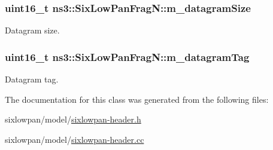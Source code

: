 \subsubsection[{\texorpdfstring{m\+\_\+datagram\+Size}{m_datagramSize}}]{\setlength{\rightskip}{0pt plus 5cm}uint16\+\_\+t ns3\+::\+Six\+Low\+Pan\+Frag\+N\+::m\+\_\+datagram\+Size\hspace{0.3cm}{\ttfamily [private]}}\hypertarget{classns3_1_1SixLowPanFragN_ad3047166d90b4b1e0655302c9750691e}{}\label{classns3_1_1SixLowPanFragN_ad3047166d90b4b1e0655302c9750691e}


Datagram size. 

\subsubsection[{\texorpdfstring{m\+\_\+datagram\+Tag}{m_datagramTag}}]{\setlength{\rightskip}{0pt plus 5cm}uint16\+\_\+t ns3\+::\+Six\+Low\+Pan\+Frag\+N\+::m\+\_\+datagram\+Tag\hspace{0.3cm}{\ttfamily [private]}}\hypertarget{classns3_1_1SixLowPanFragN_a40e295bd25d3618f73e24defcbca064e}{}\label{classns3_1_1SixLowPanFragN_a40e295bd25d3618f73e24defcbca064e}


Datagram tag. 



The documentation for this class was generated from the following files\+:\begin{DoxyCompactItemize}
\item 
sixlowpan/model/\hyperlink{sixlowpan-header_8h}{sixlowpan-\/header.\+h}\item 
sixlowpan/model/\hyperlink{sixlowpan-header_8cc}{sixlowpan-\/header.\+cc}\end{DoxyCompactItemize}
